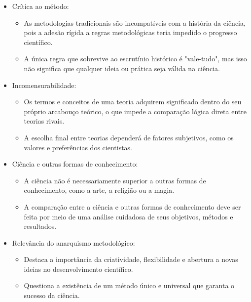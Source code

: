 \begin{itemize}
    \item Crítica ao método:
    \begin{itemize}
        \item As metodologias tradicionais são incompatíveis com a história da ciência, pois a adesão rígida a regras metodológicas teria impedido o progresso científico.
        \item A única regra que sobrevive ao escrutínio histórico é "vale-tudo", mas isso não significa que qualquer ideia ou prática seja válida na ciência.
    \end{itemize}
    \item Incomensurabilidade:
    \begin{itemize}
        \item Os termos e conceitos de uma teoria adquirem significado dentro do seu próprio arcabouço teórico, o que impede a comparação lógica direta entre teorias rivais.
        \item A escolha final entre teorias dependerá de fatores subjetivos, como os valores e preferências dos cientistas.
    \end{itemize}
    \item Ciência e outras formas de conhecimento:
    \begin{itemize}
        \item A ciência não é necessariamente superior a outras formas de conhecimento, como a arte, a religião ou a magia.
        \item A comparação entre a ciência e outras formas de conhecimento deve ser feita por meio de uma análise cuidadosa de seus objetivos, métodos e resultados.
    \end{itemize}
    \item Relevância do anarquismo metodológico:
    \begin{itemize}
        \item Destaca a importância da criatividade, flexibilidade e abertura a novas ideias no desenvolvimento científico.
        \item Questiona a existência de um método único e universal que garanta o sucesso da ciência.
    \end{itemize}
\end{itemize}


